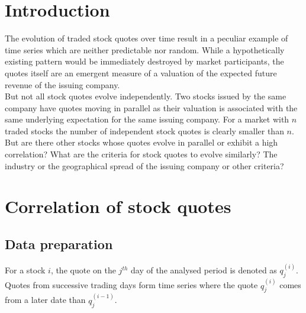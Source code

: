 \documentclass[
10pt, %
a4paper, %
oneside, %
headinclude,footinclude, %
BCOR5mm, %
]{scrartcl}
\numberwithin{equation}{subsection}
\begin{document}




\newpage %

\section{Introduction}
The evolution of traded stock quotes over time result in a peculiar example of time series which are neither predictable nor random. While a hypothetically existing pattern would be immediately destroyed by market participants, the quotes itself are an emergent measure of a valuation of the expected future revenue of the issuing company.\\
But not all stock quotes evolve independently. Two stocks issued by the same company have quotes moving in parallel as their valuation is associated with the same underlying expectation for the same issuing company. For a market with $n$ traded stocks the number of independent stock quotes is clearly smaller than $n$. But are there other stocks whose quotes evolve in parallel or exhibit a high correlation? What are the criteria for stock quotes to evolve similarly? The industry or the geographical spread of the issuing company or other criteria?\\
\section{Correlation of stock quotes}
\subsection{Data preparation}
For a stock $i$, the quote on the $j^{th}$ day of the analysed period is denoted as $q_j^{(i)}$. Quotes from successive trading days form time series where the quote $q_j^{(i)}$ comes from a later date than $q_j^{(i-1)}$.
\end{document}
